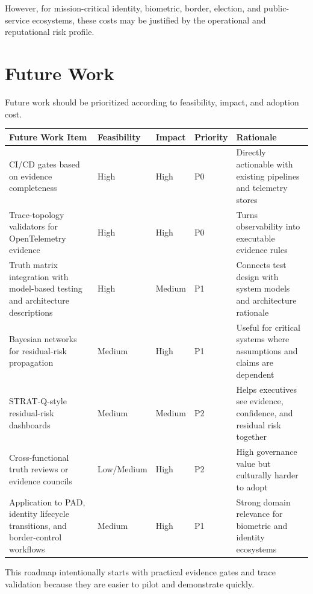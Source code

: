 \documentclass[11pt,a4paper]{article}
\begin{document}
However, for mission-critical identity, biometric, border, election, and public-service ecosystems, these costs may be justified by the operational and reputational risk profile.

\section{Future Work}

Future work should be prioritized according to feasibility, impact, and adoption cost.

\begin{longtable}{p{5.2cm}p{2.2cm}p{2.0cm}p{2.0cm}p{2.0cm}}
\toprule
\textbf{Future Work Item} & \textbf{Feasibility} & \textbf{Impact} & \textbf{Priority} & \textbf{Rationale} \\
\midrule
CI/CD gates based on evidence completeness & High & High & P0 & Directly actionable with existing pipelines and telemetry stores \\
Trace-topology validators for OpenTelemetry evidence & High & High & P0 & Turns observability into executable evidence rules \\
Truth matrix integration with model-based testing and architecture descriptions \cite{iso42010,utting} & High & Medium & P1 & Connects test design with system models and architecture rationale \\
Bayesian networks for residual-risk propagation & Medium & High & P1 & Useful for critical systems where assumptions and claims are dependent \\
STRAT-Q-style residual-risk dashboards & Medium & Medium & P2 & Helps executives see evidence, confidence, and residual risk together \\
Cross-functional truth reviews or evidence councils & Low/Medium & High & P2 & High governance value but culturally harder to adopt \\
Application to PAD, identity lifecycle transitions, and border-control workflows & Medium & High & P1 & Strong domain relevance for biometric and identity ecosystems \\
\bottomrule
\end{longtable}

This roadmap intentionally starts with practical evidence gates and trace validation because they are easier to pilot and demonstrate quickly.

\end{document}
